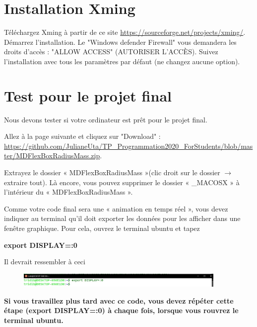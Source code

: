\documentclass{article}
\begin{document}
\section{Installation Xming}
Téléchargez Xming à partir de ce site \href{https://sourceforge.net/projects/xming/}{https://sourceforge.net/projects/xming/}. Démarrez l'installation. Le "Windows defender Firewall" vous demandera les droits d'accès : "ALLOW ACCESS" (AUTORISER L'ACCÈS). Suivez l'installation avec tous les paramètres par défaut (ne changez aucune option).

\section{Test pour le projet final}
Nous devons tester si votre ordinateur est prêt pour le projet final.

Allez à la page suivante et cliquez sur "Download" : \\ \href{https://github.com/JulianeUta/TP_Programmation2020_ForStudents/blob/master/MDFlexBoxRadiusMass.zip}{https://github.com/JulianeUta/TP\_Programmation2020\_ForStudents/blob/master/MDFlexBoxRadiusMass.zip}.

Extrayez le dossier « MDFlexBoxRadiusMass »(clic droit sur le dossier $\rightarrow$ extraire tout). Là encore, vous pouvez supprimer le dossier « \_MACOSX » à l'intérieur du « MDFlexBoxRadiusMass ».

Comme votre code final sera une « animation en temps réel », vous devez indiquer au terminal qu'il doit exporter les données pour les afficher dans une fenêtre graphique. Pour cela, ouvrez le terminal ubuntu et tapez 
\begin{tcolorbox}[width=\textwidth,colframe=BurntOrange,colback={black},title={ubuntu terminal},outer arc=0mm,colupper=white]  
    \large\textbf{  export DISPLAY=:0 }
\end{tcolorbox}
Il devrait ressembler à ceci
\begin{figure}[H]
\center
\includegraphics[width=0.9\textwidth]{Plots/MD_1EXPORT.jpeg}
\end{figure}
{\color{Bittersweet}\textbf{Si vous travaillez plus tard avec ce code, vous devez répéter cette étape (export DISPLAY=:0) à chaque fois, lorsque vous rouvrez le terminal ubuntu.}}
\end{document}
